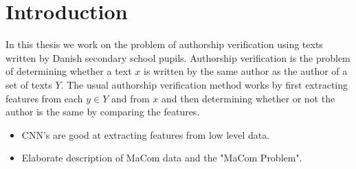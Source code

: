 \section{Introduction} \label{sec:introduction}

In this thesis we work on the problem of authorship verification using texts
written by Danish secondary school pupils. Authorship verification is the
problem of determining whether a text $x$ is written by the same author as the
author of a set of texts $Y$. The usual authorship verification method works by
first extracting features from each $y \in Y$ and from $x$ and then determining
whether or not the author is the same by comparing the features.

\begin{itemize}
    \item CNN's are good at extracting features from low level data.
    \item Elaborate description of MaCom data and the "MaCom Problem".
\end{itemize}
